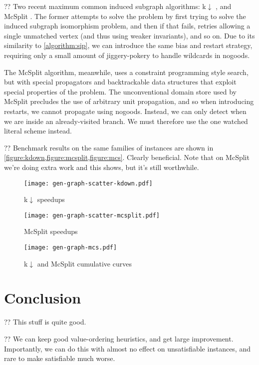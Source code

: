 \documentclass{article}
\newcommand{\citep}[1]{\cite{#1}}
\begin{document}
?? Two recent maximum common induced subgraph algorithms: k${\downarrow}$
\citep{DBLP:conf/aaai/HoffmannMR17}, and McSplit \citep{DBLP:conf/ijcai/McCreeshPT17}. The former
attempts to solve the problem by first trying to solve the induced subgraph isomorphism problem, and
then if that fails, retries allowing a single unmatched vertex (and thus using weaker invariants),
and so on. Due to its similarity to \cref{algorithm:sip}, we can introduce the same bias and restart
strategy, requiring only a small amount of jiggery-pokery to handle wildcards in nogoods.

The McSplit algorithm, meanwhile, uses a constraint programming style search, but with special
propagators and backtrackable data structures that exploit special properties of the problem. The
unconventional domain store used by McSplit precludes the use of arbitrary unit propagation, and so
when introducing restarts, we cannot propagate using nogoods. Instead, we can only detect when we
are inside an already-visited branch. We must therefore use the one watched literal scheme instead.

?? Benchmark results on the same families of instances are shown in
\cref{figure:kdown,figure:mcsplit,figure:mcs}. Clearly beneficial. Note that on McSplit we're doing
extra work and this shows, but it's still worthwhile.

\begin{figure}[p]
    \centering
    \texttt{[image: gen-graph-scatter-kdown.pdf]}
    \caption{k${\downarrow}$ speedups}\label{figure:kdown}
\end{figure}

\begin{figure}[p]
    \centering
    \texttt{[image: gen-graph-scatter-mcsplit.pdf]}
    \caption{McSplit speedups}\label{figure:mcsplit}
\end{figure}

\begin{figure}[p]
    \centering
    \texttt{[image: gen-graph-mcs.pdf]}
    \caption{k${\downarrow}$ and McSplit cumulative curves}\label{figure:mcs}
\end{figure}

\section{Conclusion}

?? This stuff is quite good.

?? We can keep good value-ordering heuristics, and get large improvement. Importantly, we can do
this with almost no effect on unsatisfiable instances, and rare to make satisfiable much worse.
\end{document}
